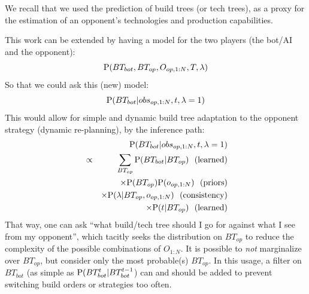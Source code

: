 We recall that we used the prediction of build trees (or tech trees), as a proxy for the estimation of an opponent's technologies and production capabilities.

This work can be extended by having a model for the two players (the bot/AI and the opponent):
$$\mathrm{P}(BT_{bot}, BT_{op}, O_{op,1:N}, T, \lambda)$$
So that we could ask this (new) model: $$\mathrm{P}(BT_{bot} | obs_{op, 1:N}, t, \lambda=1)$$
This would allow for simple and dynamic build tree adaptation to the opponent strategy (dynamic re-planning), by the inference path:
\begin{eqnarray*}
& & \PP(BT_{bot} | obs_{op, 1:N}, t, \lambda=1)\\
& \propto & \sum_{BT_{op}} \PP(BT_{bot} | BT_{op}) \ \ \mathrm{(learned)} \\
& & \times \PP(BT_{op})\PP(o_{op, 1:N}) \ \ \mathrm{(priors)} \\
& & \times \PP(\lambda | BT_{op}, o_{op, 1:N}) \ \ \mathrm{(consistency)} \\
& & \times \PP(t|BT_{op}) \ \ \mathrm{(learned)}
\end{eqnarray*}
That way, one can ask ``what build/tech tree should I go for against what I see from my opponent'', which tacitly seeks the distribution on $BT_{op}$ to reduce the complexity of the possible combinations of $O_{1:N}$. It is possible to \textit{not} marginalize over $BT_{op}$, but consider only the most probable(s) $BT_{op}$. In this usage, a filter on $BT_{bot}$ (as simple as $\mathrm{P}(BT_{bot}^t | BT_{bot}^{t-1}$) can and should be added to prevent switching build orders or strategies too often.


